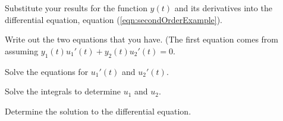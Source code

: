 \begin{problem}
\begin{subproblem}
      \vfill

    \clearpage

  \item Substitute your results for the function $y(t)$ and its
    derivatives into the differential equation, equation
    (\ref{eqn:secondOrderExample}).

    \vfill

  \item Write out the two equations that you have. (The first equation
    comes from assuming $y_1(t) u_1'(t) + y_2(t) u_2'(t)=0$.

    \vfill

  \item Solve the equations for $u_1'(t)$ and $u_2'(t)$.

    \vfill

    \clearpage

  \item Solve the integrals to determine $u_1$ and $u_2$.

    \vfill

  \item Determine the solution to the differential equation.

    \vfill

  \end{subproblem}

  \end{problem}

